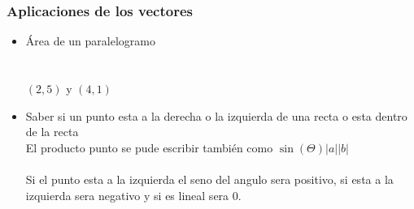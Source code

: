 \subsubsection{Aplicaciones de los vectores}
\begin{itemize}
  \item Área de un paralelogramo
  \\
  \\
  \\
  $\left ( 2,5 \right )$ y $\left (4,1 \right )$
  \item Saber si un punto esta a la derecha o la izquierda  de una recta o esta dentro de la recta
  \\El producto punto se pude escribir también como $\sin \left ( \Theta  \right )\left | a \right |\left | b \right |$
  \\
  \\
  Si el punto esta a la izquierda el seno del angulo sera positivo, si esta a la izquierda sera negativo y si es lineal sera 0.
\end{itemize}
